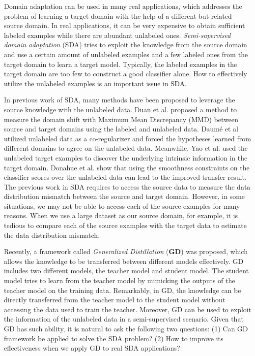 Domain adaptation can be used in many real applications, which addresses the problem of learning a target domain with the help of a different but related source domain. 
In real applications, it can be very expensive to obtain sufficient labeled examples while there are abundant unlabeled ones. 
\textit{Semi-supervised domain adaptation} (SDA) tries to exploit the knowledge from the source domain and use a certain amount of unlabeled examples and a few labeled ones from the target domain to learn a target model. Typically, the labeled examples in the target domain are too few to construct a good classifier alone. How to effectively utilize the unlabeled examples is an important issue in SDA. 

In previous work of SDA, many methods have been proposed to leverage the source knowledge with the unlabeled data.
Duan et al.\cite{duan2012visual} proposed a method to measure the domain shift with Maximum Mean Discrepancy (MMD) between source and target domains using the labeled and unlabeled data. Daum{\'e} et al\cite{daume2010frustratingly} utilized unlabeled data as a co-regularizer and forced the hypotheses learned from different domains to agree on the unlabeled data. Meanwhile, Yao et al.\cite{yao2015semi} used the unlabeled target examples to discover the underlying intrinsic information in the target domain. Donahue et al.\cite{Donahue_2013_CVPR} show that using the smoothness constraints on the classifier scores over the unlabeled data can lead to the improved transfer result.
The previous work in SDA requires to access the source data to measure the data distribution mismatch between the source and target domain.
However, in some situations, we may not be able to access each of the source examples for many reasons. When we use a large dataset as our source domain, for example, it is tedious to compare each of the source examples with the target data to estimate the data distribution mismatch.

Recently, a framework called \textit{Generalized Distillation} (\textbf{GD})\cite{lopez2015unifying} was proposed, which allows the knowledge to be transferred between different models effectively. GD includes two different models, the teacher model and student model. The student model tries to learn from the teacher model by mimicking the outputs of the teacher model on the training data. Remarkably, in GD, the knowledge can be directly transferred from the teacher model to the student model without accessing the data used to train the teacher. Moreover, GD can be used to exploit the information of the unlabeled data in a semi-supervised scenario\cite{lopez2015unifying}.
Given that GD has such ability, it is natural to ask the following two questions: (1) Can GD framework be applied to solve the SDA problem? (2) How to improve its effectiveness when we apply GD to real SDA applications?


